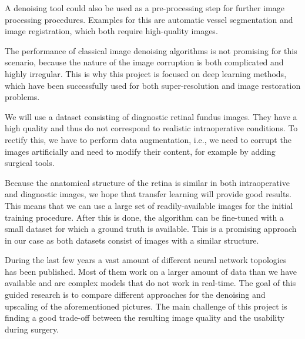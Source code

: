 \documentclass{scrartcl}
\begin{document}
A denoising tool could also be used as a pre-processing step for further image processing procedures.
Examples for this are automatic vessel segmentation and image registration, which both require high-quality images.

The performance of classical image denoising algorithms is not promising for this scenario, because the nature of the image corruption is both complicated and highly irregular.
This is why this project is focused on deep learning methods, which have been successfully used for both super-resolution and image restoration problems.

We will use a dataset consisting of diagnostic retinal fundus images.
They have a high quality and thus do not correspond to realistic intraoperative conditions.
To rectify this, we have to perform data augmentation, i.e., we need to corrupt the images artificially and need to modify their content, for example by adding surgical tools.

Because the anatomical structure of the retina is similar in both intraoperative and diagnostic images, we hope that transfer learning will provide good results.
This means that we can use a large set of readily-available images for the initial training procedure.
After this is done, the algorithm can be fine-tuned with a small dataset for which a ground truth is available.
This is a promising approach in our case as both datasets consist of images with a similar structure.

During the last few years a vast amount of different neural network topologies has been published.
Most of them work on a larger amount of data than we have available and are complex models that do not work in real-time.
The goal of this guided research is to compare different approaches for the denoising and upscaling of the aforementioned pictures.
The main challenge of this project is finding a good trade-off between the resulting image quality and the usability during surgery.

\end{document}
